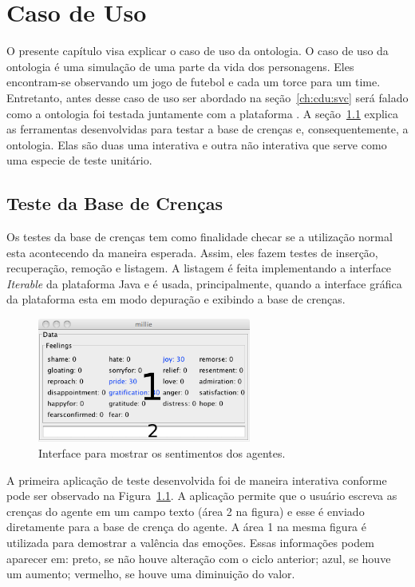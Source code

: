 \chapter{Caso de Uso} \label{ch:cdu}

O presente capítulo visa explicar o caso de uso da ontologia. O caso de uso da
ontologia é uma simulação de uma parte da vida dos personagens. Eles
encontram-se observando um jogo de futebol e cada um torce para um time.
Entretanto, antes desse caso de uso ser abordado na seção~\ref{ch:cdu:svc}
será falado como a ontologia foi testada juntamente com a plataforma \jason.
A seção~\ref{ch:cdu:tbc} explica as ferramentas desenvolvidas para testar a base
de crenças e, consequentemente, a ontologia. Elas são duas uma interativa e
outra não interativa que serve como uma especie de teste unitário.

\section{Teste da Base de Crenças} \label{ch:cdu:tbc}

Os testes da base de crenças tem como finalidade checar se a utilização normal
esta acontecendo da maneira esperada. Assim, eles fazem testes de inserção,
recuperação, remoção e listagem. A listagem é feita implementando a interface
\emph{Iterable} da plataforma Java e é usada, principalmente, quando a
interface gráfica da plataforma \jason esta em modo depuração e
exibindo a base de crenças.

\begin{figure}
	\begin{center}
		\includegraphics[width=70mm]{figuras/introductionDF.png}
	\end{center}
	\caption{Interface para mostrar os sentimentos dos agentes.}
	\label{fig:introducaoDF}
\end{figure}

A primeira aplicação de teste desenvolvida foi de maneira interativa conforme
pode ser observado na Figura~\ref{fig:introducaoDF}. A aplicação permite que o
usuário escreva as crenças do agente em um campo texto (área 2 na figura) e
esse é enviado diretamente para a base de crença do agente. A área 1 na mesma
figura é utilizada para demostrar a valência das emoções.
Essas informações podem aparecer em: preto, se não houve alteração com o ciclo
anterior; azul, se houve um aumento; vermelho, se houve uma diminuição do
valor.

